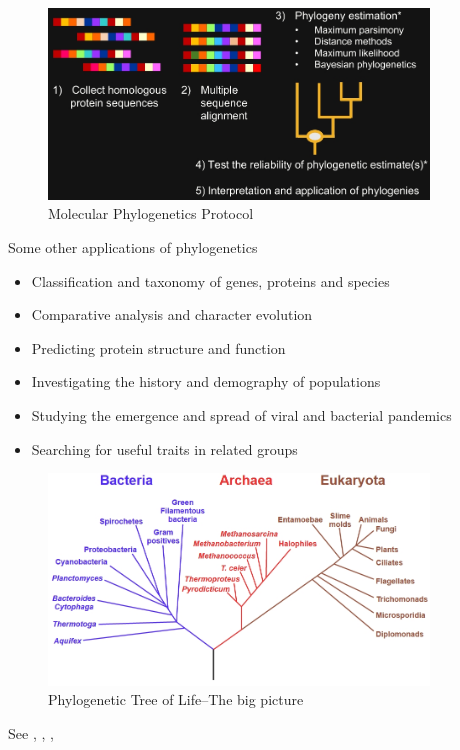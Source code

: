 \documentclass[]{article}
\begin{document}
\begin{figure}[H]
	\caption{Molecular Phylogenetics Protocol}\label{fig:MolecularPhylogeneticsProtocol}
	\includegraphics[width=0.9\textwidth]{MolecularPhylogeneticsProtocol}
\end{figure}
Some other applications of phylogenetics
\begin{itemize}
	\item Classification and taxonomy of genes, proteins and species
	\item Comparative analysis and character evolution
	\item Predicting protein structure and function
	\item Investigating the history and demography of populations
	\item Studying the emergence and spread of viral and bacterial pandemics
	\item Searching for useful traits in related groups
\end{itemize}

\begin{figure}[H]
	\caption{Phylogenetic Tree of Life--The big picture}
	\label{flg:the:big:picture}
	\includegraphics[width=0.9\textwidth]{TOL5}
\end{figure}

See \cite{hillis1996molecular}, \cite{zuckerkandl1965molecules}, \cite{williams2006assessing}, \cite{woese2002evolution}
\end{document}
